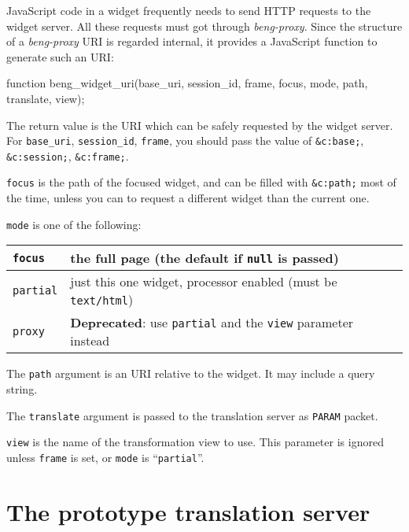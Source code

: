 \documentclass[a4paper,12pt]{article}
\begin{document}
JavaScript code in a widget frequently needs to send HTTP requests to
the widget server.  All these requests must got through
\emph{beng-proxy}.  Since the structure of a \emph{beng-proxy} URI is
regarded internal, it provides a JavaScript function to generate such
an URI:

\begin{verbatim*}
function
beng_widget_uri(base_uri, session_id, frame, focus, mode,
                path, translate, view);
\end{verbatim*}

The return value is the URI which can be safely requested by the
widget server.  For \texttt{base\_uri}, \texttt{session\_id},
\texttt{frame}, you should pass the value of \texttt{\&c:base;},
\texttt{\&c:session;}, \texttt{\&c:frame;}.

\texttt{focus} is the path of the focused widget, and can be filled
with \texttt{\&c:path;} most of the time, unless you can to request a
different widget than the current one.

\texttt{mode} is one of the following:

\begin{longtable}{|l|p{11cm}|}
\hline

\texttt{focus} & the full page (the default if \texttt{null} is
passed) \\

\hline

\texttt{partial} & just this one widget, processor enabled (must be
\texttt{text/html}) \\

\hline
\texttt{proxy} &
\textbf{Deprecated}: use \texttt{partial} and the \texttt{view}
parameter instead \\
\hline
\end{longtable}

The \texttt{path} argument is an URI relative to the widget.  It may
include a query string.

The \texttt{translate} argument is passed to the translation server as
\texttt{PARAM} packet.

\texttt{view} is the name of the transformation view to use.  This
parameter is ignored unless \texttt{frame} is set, or \texttt{mode} is
``\texttt{partial}''.


\section{The prototype translation server}
\end{document}
